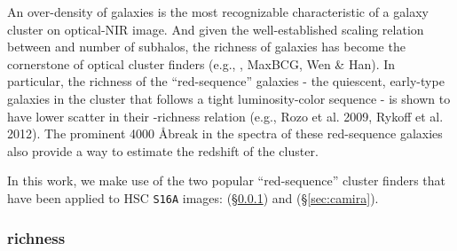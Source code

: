 \documentclass[fleqn,usenatbib,useAMS,english]{mnras}
\begin{document}
    
    An over-density of galaxies is the most recognizable characteristic of a galaxy cluster on
    optical-NIR image.
    And given the well-established scaling relation between \mvir{} and number of subhalos,
    the richness of galaxies has become the cornerstone of optical cluster finders
    (e.g., \addref{}, MaxBCG, Wen \& Han).
    In particular, the richness of the ``red-sequence'' galaxies - the quiescent, early-type
    galaxies in the cluster that follows a tight luminosity-color sequence - is shown to have
    lower scatter in their \mvir{}-richness relation
    (e.g., \addref{} Rozo et al. 2009, Rykoff et al. 2012).
    The prominent 4000 \AA break in the spectra of these red-sequence galaxies also provide a
    way to estimate the redshift of the cluster.

    In this work, we make use of the two popular ``red-sequence'' cluster finders that have been
    applied to HSC \texttt{S16A} images: \redm{} (\S \ref{sec:redmapper}) and \camira{}
    (\S \ref{sec:camira}).

\subsubsection{\redm{} richness}
    \label{sec:redmapper}

\end{document}
